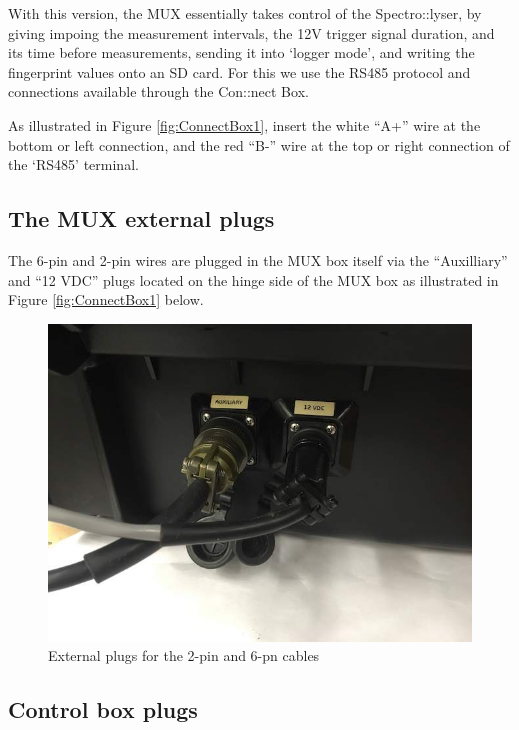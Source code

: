 \documentclass[]{book}
\begin{document}
With this version, the MUX essentially takes control of the Spectro::lyser, by giving impoing the measurement intervals, the 12V trigger signal duration, and its time before measurements, sending it into `logger mode', and writing the fingerprint values onto an SD card. For this we use the RS485 protocol and connections available through the Con::nect Box.

As illustrated in Figure \ref{fig:ConnectBox1}, insert the white ``A+'' wire at the bottom or left connection, and the red ``B-'' wire at the top or right connection of the `RS485' terminal.

\hypertarget{the-mux-external-plugs}{%
\subsection{The MUX external plugs}\label{the-mux-external-plugs}}

The 6-pin and 2-pin wires are plugged in the MUX box itself via the ``Auxilliary'' and ``12 VDC'' plugs located on the hinge side of the MUX box as illustrated in Figure \ref{fig:ConnectBox1} below.

\begin{figure}

{\centering \includegraphics[width=0.8\linewidth]{pictures/ExternalPlugs} 

}

\caption{External plugs for the 2-pin and 6-pn cables}\label{fig:ExternalPlugs}
\end{figure}

\hypertarget{control-box-plugs}{%
\subsection{Control box plugs}\label{control-box-plugs}}
\end{document}
